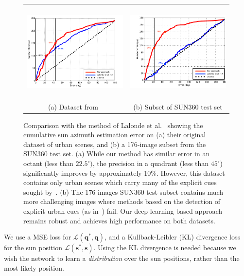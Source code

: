 \begin{figure}[!th]
    \centering
    \footnotesize
    \setlength{\tabcolsep}{1pt}
    \begin{tabular}{cc}
    \includegraphics[height=5cm]{figures/compare_jf12/lalonde-db-margin.pdf} & 
    \includegraphics[height=5cm]{figures/compare_jf12/sun360-db-margin.pdf} \\
    (a) Dataset from~\cite{lalonde-ijcv-12} &
    (b) Subset of SUN360 test set
    \end{tabular}
    \vspace{.5em} 
    \caption[Performance comparison on an urban dataset]{Comparison with the method of Lalonde et al.~\cite{lalonde-ijcv-12} showing the cumulative sun azimuth estimation error on (a) their original dataset of urban scenes, and (b) a 176-image subset from the SUN360 test set. (a) While our method has similar error in an octant (less than $22.5^\circ)$, the precision in a quadrant (less than $45^\circ$) significantly improves by approximately 10\%. However, this dataset contains only urban scenes which carry many of the explicit cues sought by~\cite{lalonde-ijcv-12}. (b) The 176-images SUN360 test subset contains much more challenging images where methods based on the detection of explicit urban cues (as in~\cite{lalonde-ijcv-12}) fail. Our deep learning based approach remains robust and achieves high performance on both datasets.}
    \label{fig:comparison-lalonde12}
\end{figure}

We use a MSE loss for $\mathcal{L}(\mathbf{q}^*, \mathbf{q})$, and a Kullback-Leibler (KL) divergence loss for the sun position $\mathcal{L}(\mathbf{s}^*, \mathbf{s})$. Using the KL divergence is needed because we wish the network to learn a \emph{distribution} over the sun positions, rather than the most likely position. 

